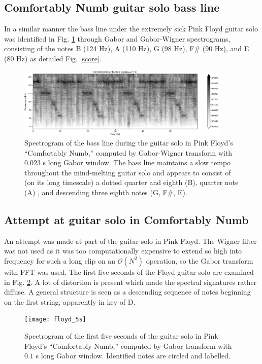 \documentclass{article}
\begin{document}
\subsection{Comfortably Numb guitar solo bass line}
In a similar manner the bass line under the extremely sick Pink Floyd guitar solo was identified in Fig. \ref{floyd} through Gabor and Gabor-Wigner spectrograms, consisting of the notes B (124 Hz), A (110 Hz), G (98 Hz), F\# (90 Hz), and E (80 Hz) as detailed Fig. \ref{score}.

\begin{figure}[t!]
  \centering
  \includegraphics[width=0.9\textwidth]{floyd/floyd_gab_wig}
  \caption{Spectrogram of the bass line during the guitar solo in Pink Floyd's ``Comfortably Numb,'' computed by Gabor-Wigner transform with $0.023$ s long Gabor window. The bass line maintains a slow tempo throughout the mind-melting guitar solo and appears to consist of (on its long timescale) a dotted quarter and eighth (B), quarter note (A) , and descending three eighth notes (G, F\#, E).}\label{floyd}
\end{figure}

\subsection{Attempt at guitar solo in Comfortably Numb}
An attempt was made at part of the guitar solo in Pink Floyd. The Wigner filter was not used as it was too computationally expensive to extend so high into frequency for such a long clip on an $\mathcal{O}(N^2)$ operation, so the Gabor transform with FFT was used. The first five seconds of the Floyd guitar solo are examined in Fig. \ref{floyd_5s}. A lot of distortion is present which made the spectral signatures rather diffuse. A general structure is seen as a descending sequence of notes beginning on the first string, apparently in key of D.

\begin{figure}[b!]
  \centering
  \texttt{[image: floyd\_5s]}
  \caption{Spectrogram of the first five seconds of the guitar solo in Pink Floyd's ``Comfortably Numb,'' computed by Gabor transform with $0.1$ s long Gabor window. Identified notes are circled and labelled.}\label{floyd_5s}
\end{figure}
\end{document}
